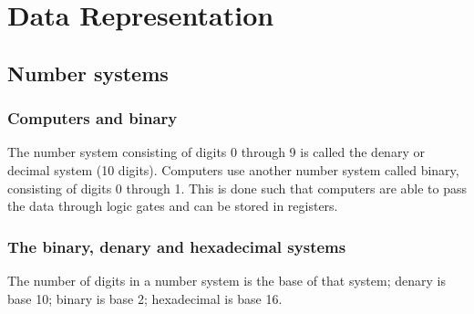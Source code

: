 \documentclass{article}
\begin{document}
\tableofcontents \newpage
\section {Data Representation}
\subsection{Number systems}

\subsubsection{Computers and binary}
The number system consisting of digits 0 through 9 is called the denary or decimal system
(10 digits). Computers use another number system called binary, consisting of digits
0 through 1. This is done such that computers are able to pass the data through logic 
gates and can be stored in registers.

\subsubsection{The binary, denary and hexadecimal systems}
The number of digits in a number system is the base of that system; denary is base 10;
binary is base 2; hexadecimal is base 16.
\end{document}
